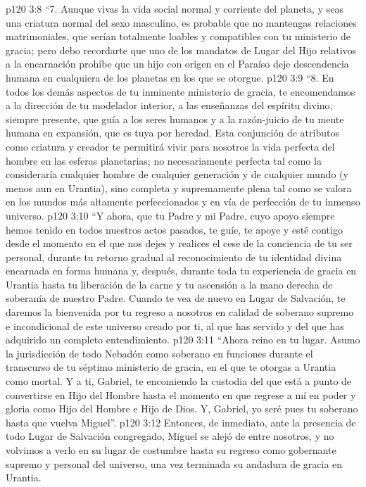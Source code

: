 \vs p120 3:8 \pc “7. Aunque vivas la vida social normal y corriente del planeta, y seas una criatura normal del sexo masculino, es probable que no mantengas relaciones matrimoniales, que serían totalmente loables y compatibles con tu ministerio de gracia; pero debo recordarte que uno de los mandatos de Lugar del Hijo relativos a la encarnación prohíbe que un hijo con origen en el Paraíso deje descendencia humana en cualquiera de los planetas en los que se otorgue.
\vs p120 3:9 \pc “8. En todos los demás aspectos de tu inminente ministerio de gracia, te encomendamos a la dirección de tu modelador interior, a las enseñanzas del espíritu divino, siempre presente, que guía a los seres humanos y a la razón\hyp{}juicio de tu mente humana en expansión, que es tuya por heredad. Esta conjunción de atributos como criatura y creador te permitirá vivir para nosotros la vida perfecta del hombre en las esferas planetarias; no necesariamente perfecta tal como la consideraría cualquier hombre de cualquier generación y de cualquier mundo (y menos aun en Urantia), sino completa y supremamente plena tal como se valora en los mundos más altamente perfeccionados y en vía de perfección de tu inmenso universo.
\vs p120 3:10 “Y ahora, que tu Padre y mi Padre, cuyo apoyo siempre hemos tenido en todos nuestros actos pasados, te guíe, te apoye y esté contigo desde el momento en el que nos dejes y realices el cese de la conciencia de tu ser personal, durante tu retorno gradual al reconocimiento de tu identidad divina encarnada en forma humana y, después, durante toda tu experiencia de gracia en Urantia hasta tu liberación de la carne y tu ascensión a la mano derecha de soberanía de nuestro Padre. Cuando te vea de nuevo en Lugar de Salvación, te daremos la bienvenida por tu regreso a nosotros en calidad de soberano supremo e incondicional de este universo creado por ti, al que has servido y del que has adquirido un completo entendimiento.
\vs p120 3:11 “Ahora reino en tu lugar. Asumo la jurisdicción de todo Nebadón como soberano en funciones durante el transcurso de tu séptimo ministerio de gracia, en el que te otorgas a Urantia como mortal. Y a ti, Gabriel, te encomiendo la custodia del que está a punto de convertirse en Hijo del Hombre hasta el momento en que regrese a mí en poder y gloria como Hijo del Hombre e Hijo de Dios. Y, Gabriel, yo seré pues tu soberano hasta que vuelva Miguel”.
\separatorline
\vs p120 3:12 Entonces, de inmediato, ante la presencia de todo Lugar de Salvación congregado, Miguel se alejó de entre nosotros, y no volvimos a verlo en su lugar de costumbre hasta su regreso como gobernante supremo y personal del universo, una vez terminada su andadura de gracia en Urantia.
